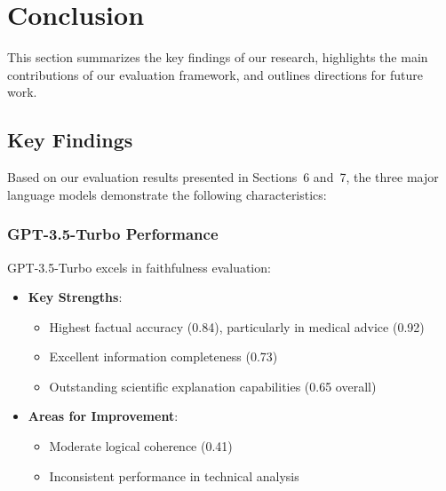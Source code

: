 \section{Conclusion}
This section summarizes the key findings of our research, highlights the main contributions of our evaluation framework, and outlines directions for future work.

\subsection{Key Findings}
Based on our evaluation results presented in Sections~6 and~7, the three major language models demonstrate the following characteristics:

\vspace{0.5em}
\subsubsection{GPT-3.5-Turbo Performance}
GPT-3.5-Turbo excels in faithfulness evaluation:
\begin{itemize}
    \item \textbf{Key Strengths}:
    \begin{itemize}
        \item Highest factual accuracy (0.84), particularly in medical advice (0.92)
        \item Excellent information completeness (0.73)
        \item Outstanding scientific explanation capabilities (0.65 overall)
    \end{itemize}
    \vspace{0.5em}
    \item \textbf{Areas for Improvement}:
    \begin{itemize}
        \item Moderate logical coherence (0.41)
        \item Inconsistent performance in technical analysis
    \end{itemize}
\end{itemize}

\vspace{0.5em}
